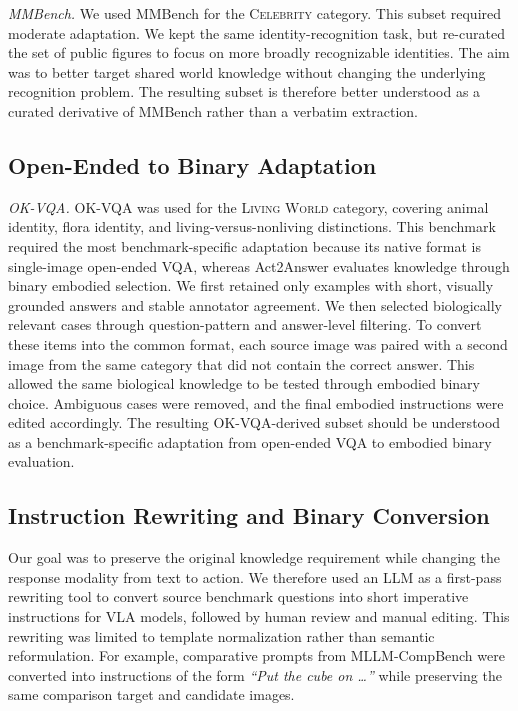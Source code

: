 \documentclass{llmxive}
\begin{document}
\noindent\textit{MMBench.}
We used MMBench for the \textsc{Celebrity} category. This subset required moderate adaptation. We kept the same identity-recognition task, but re-curated the set of public figures to focus on more broadly recognizable identities. The aim was to better target shared world knowledge without changing the underlying recognition problem. The resulting subset is therefore better understood as a curated derivative of MMBench rather than a verbatim extraction.


\subsection{Open-Ended to Binary Adaptation}

\noindent\textit{OK-VQA.}
OK-VQA was used for the \textsc{Living World} category, covering animal identity, flora identity, and living-versus-nonliving distinctions. This benchmark required the most benchmark-specific adaptation because its native format is single-image open-ended VQA, whereas Act2Answer evaluates knowledge through binary embodied selection. We first retained only examples with short, visually grounded answers and stable annotator agreement. We then selected biologically relevant cases through question-pattern and answer-level filtering. To convert these items into the common format, each source image was paired with a second image from the same category that did not contain the correct answer. This allowed the same biological knowledge to be tested through embodied binary choice. Ambiguous cases were removed, and the final embodied instructions were edited accordingly. The resulting OK-VQA-derived subset should be understood as a benchmark-specific adaptation from open-ended VQA to embodied binary evaluation.

\subsection{Instruction Rewriting and Binary Conversion}
\label{sec:appendix_instruction_rewriting}

Our goal was to preserve the original knowledge requirement while changing the response modality from text to action. We therefore used an LLM as a first-pass rewriting tool to convert source benchmark questions into short imperative instructions for VLA models, followed by human review and manual editing. This rewriting was limited to template normalization rather than semantic reformulation. For example, comparative prompts from MLLM-CompBench were converted into instructions of the form \textit{``Put the cube on \ldots''} while preserving the same comparison target and candidate images.
\end{document}
